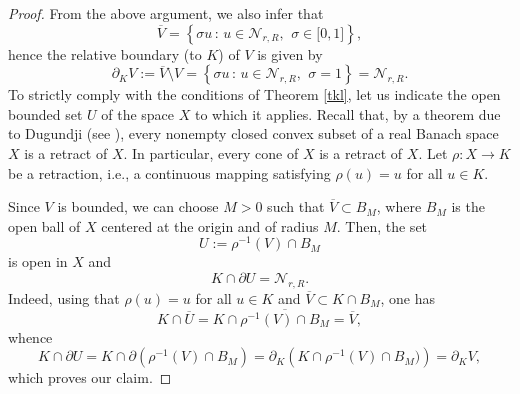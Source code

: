 \documentclass{birkjour}
\theoremstyle{definition}
\theoremstyle{remark}
\numberwithin{equation}{section}
\begin{document}
\begin{proof}
From the above argument, we also infer that
\begin{equation*}
\overline{V}=\left\{ \sigma u\,:\,u\in \mathcal{N}_{r,R},\,\ \sigma \in
\lbrack 0,1]\right\} ,
\end{equation*}%
hence the relative boundary (to $K$) of $V$ is given by
\begin{equation*}
\partial _{K}V:=\overline{V}\setminus V=\left\{ \sigma u\,:\,u\in \mathcal{N}%
_{r,R},\,\ \sigma =1\right\} =\mathcal{N}_{r,R}.
\end{equation*}%
To strictly comply with the conditions of Theorem \ref{tkl}, let us indicate
the open bounded set $U$ of the space $X$ to which it applies. Recall that,
by a theorem due to Dugundji (see \cite[Corollary~4.2]{jd}), every nonempty
closed convex subset of a real Banach space $X$ is a retract of $X$. In
particular, every cone of $X$ is a retract of $X$. Let $\rho \colon
X\rightarrow K$ be a retraction, i.e., a continuous mapping satisfying $\rho
(u)=u$ for all $u\in K$.

Since $V$ is bounded, we can choose $M>0$ such that $\overline{V}\subset
B_{M}$, where $B_{M}$ is the open ball of $X$ centered at the origin and of
radius $M.$ Then, the set
\begin{equation*}
U:=\rho ^{-1}(V)\cap B_{M}
\end{equation*}%
is open in $X$ and
\begin{equation*}
K\cap \partial U=\mathcal{N}_{r,R}.
\end{equation*}%
Indeed, using that $\rho (u)=u$ for all $u\in K$ and $\overline{V}\subset
K\cap B_{M}$, one has
\begin{equation*}
K\cap \overline{U}=K\cap \overline{\rho ^{-1}(V)\cap B_{M}}=\overline{V},
\end{equation*}%
whence
\begin{equation*}
K\cap \partial U=K\cap \partial (\rho ^{-1}(V)\cap B_{M})=\partial
_{K}\left( K\cap \rho ^{-1}(V)\cap B_{M})\right) =\partial _{K}V,
\end{equation*}%
which proves our claim.


\end{proof}
\end{document}
